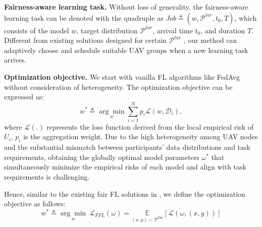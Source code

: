 \documentclass[lettersize,journal]{IEEEtran}
\begin{document}
\textbf{Fairness-aware learning task.} Without loss of generality, the fairness-aware learning task can be denoted with the quadruple as $Job\triangleq(w,\mathcal{P}^{tar},t_0, T)$, which consists of the model $w$, target distribution $\mathcal{P}^{tar}$, arrival time $t_0$, and duration $T$. Different from existing solutions designed for certain $\mathcal{P}^{tar}$ \cite{li2022data,zeng2022heterogeneous,hiessl2022cohort}, our method can adaptively choose and schedule suitable UAV groups when a new learning task arrives. 

\textbf{Optimization objective.} We start with vanilla FL algorithms like FedAvg \cite{li2019convergence-fedavg} without consideration of heterogeneity. The optimization objective can be expressed as: 
\begin{equation}
    w^{*}\triangleq \underset{w}{\arg \min } \sum_{i=1}^N p_i\mathcal{L}\left(w, \mathcal{D}_{i}\right) ,
\end{equation}
where $\mathcal{L}(.)$ represents the loss function derived from the local empirical risk of $U_i$, $p_i$ is the aggregation weight. Due to the high heterogeneity among UAV nodes and the substantial mismatch between participants' data distributions and task requirements, obtaining the globally optimal model parameters $\omega^{*}$ that simultaneously minimize the empirical risks of each model and align with task requirements is challenging. %

Hence, similar to the existing fair FL solutions in \cite{mohri2019agnostic,zhang2020fairfl,ezzeldin2023fairfed}, we define the optimization objective as follows:
\begin{equation}
    w^{*}\triangleq \underset{w}{\arg \min } \ \mathcal{L}_{FFL}(\omega)=\underset{(x, y) \sim \mathcal{P}^{Tar}}{\mathbb{E}}[\mathcal{L}{(\omega,(x, y))}]
\end{equation}
\end{document}
